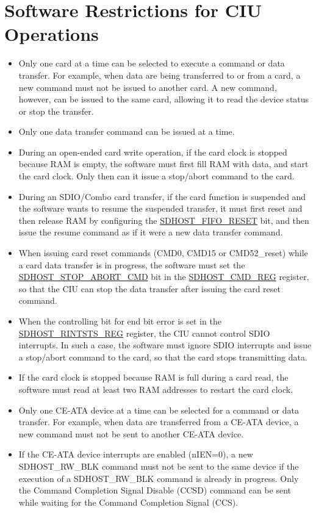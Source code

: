 \documentclass[main\_\_EN.tex]{subfiles}
\begin{document}
\section{Software Restrictions for CIU Operations}
\begin{itemize}
	\item Only one card at a time can be selected to execute a command or data transfer. For example, when data are being transferred to or from a card, a new command must not be issued to another card. A new command, however, can be issued to the same card, allowing it to read the device status or stop the transfer. 
	\item Only one data transfer command can be issued at a time. 
	\item During an open-ended card write operation, if the card clock is stopped because RAM is empty, the software must first fill RAM with data, and start the card clock. Only then can it issue a stop/abort command to the card. 
	\item During an SDIO/Combo card transfer, if the card function is suspended and the software wants to resume the suspended transfer, it must first reset and then release RAM by configuring the \hyperref[fielddesc:SDHOSTFIFORESET]{SDHOST\_FIFO\_RESET} bit, and then issue the resume command as if it were a new data transfer command. 
	\item When issuing card reset commands (CMD0, CMD15 or CMD52\_reset) while a card data transfer is in progress, the software must set the \hyperref[fielddesc:SDHOSTSTOPABORTCMD]{SDHOST\_STOP\_ABORT\_CMD} bit in the \hyperref[regdesc:SDHOSTCMDREG]{SDHOST\_CMD\_REG} register, so that the CIU can stop the data transfer after issuing the card reset command. 
	\item When the controlling bit for end bit error is set in the \hyperref[regdesc:SDHOSTRINTSTSREG]{SDHOST\_RINTSTS\_REG} register, the CIU cannot control SDIO interrupts. In such a case, the software must ignore SDIO interrupts and issue a stop/abort command to the card, so that the card stops transmitting data. 
    \item If the card clock is stopped because RAM is full during a card read, the software must read at least two RAM addresses to restart the card clock. 
	\item Only one CE-ATA device at a time can be selected for a command or data transfer. For example, when data are transferred from a CE-ATA device, a new command must not be sent to another CE-ATA device.
	\item If the CE-ATA device interrupts are enabled (nIEN=0), a new SDHOST\_RW\_BLK command must not be sent to the same device if the execution of a SDHOST\_RW\_BLK command is already in progress. Only the Command Completion Signal Disable (CCSD) command can be sent while waiting for the Command Completion Signal (CCS). 

\end{itemize}
\end{document}
